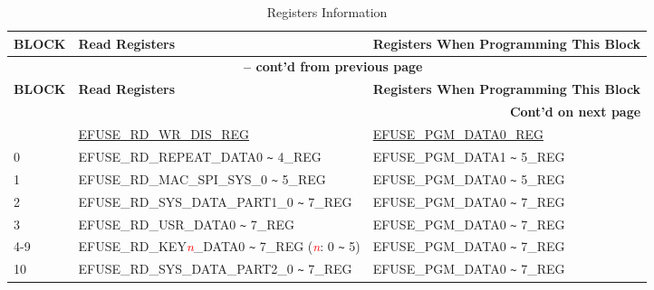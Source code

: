 \begin{longtable}[c]{|l|l|l|}
\caption{Registers Information}
\label{tab:efuse-softw-read-para}
\\\hline
    \rowcolor{lightgray}
        \textbf{BLOCK} & \textbf{Read Registers} & \textbf{Registers When Programming This Block}\\
    \endfirsthead
    
    \multicolumn{3}{c}{\bfseries \tablename\ \thetable{} -- cont'd from previous page}\\\hline
    
    \rowcolor{lightgray}
        \textbf{BLOCK} & \textbf{Read Registers} & \textbf{Registers When Programming This Block}\\
    \endhead
    
    \multicolumn{3}{r}{\textbf{Cont'd on next page}} \\
    \endfoot
    \endlastfoot
    \hline
0  & \hyperref[regdesc:EFUSERDWRDISREG]{EFUSE\_RD\_WR\_DIS\_REG} & \hyperref[regdesc:EFUSEPGMDATA0REG]{EFUSE\_PGM\_DATA0\_REG} \\\hline
0  & EFUSE\_RD\_REPEAT\_DATA0 \verb+~+ 4\_REG & EFUSE\_PGM\_DATA1 \verb+~+ 5\_REG \\\hline
1  & EFUSE\_RD\_MAC\_SPI\_SYS\_0 \verb+~+ 5\_REG & EFUSE\_PGM\_DATA0 \verb+~+ 5\_REG \\\hline
2  & EFUSE\_RD\_SYS\_DATA\_PART1\_0 \verb+~+ 7\_REG & EFUSE\_PGM\_DATA0 \verb+~+ 7\_REG \\\hline
3  & EFUSE\_RD\_USR\_DATA0 \verb+~+ 7\_REG & EFUSE\_PGM\_DATA0 \verb+~+ 7\_REG \\ \hline
4-9 & EFUSE\_RD\_KEY\textcolor{red}{\it{n}}\_DATA0 \verb+~+ 7\_REG (\textcolor{red}{\it{n}}: 0 \verb+~+ 5) & EFUSE\_PGM\_DATA0 \verb+~+ 7\_REG \\\hline
10 & EFUSE\_RD\_SYS\_DATA\_PART2\_0 \verb+~+ 7\_REG & EFUSE\_PGM\_DATA0 \verb+~+ 7\_REG \\\hline
\end{longtable}
